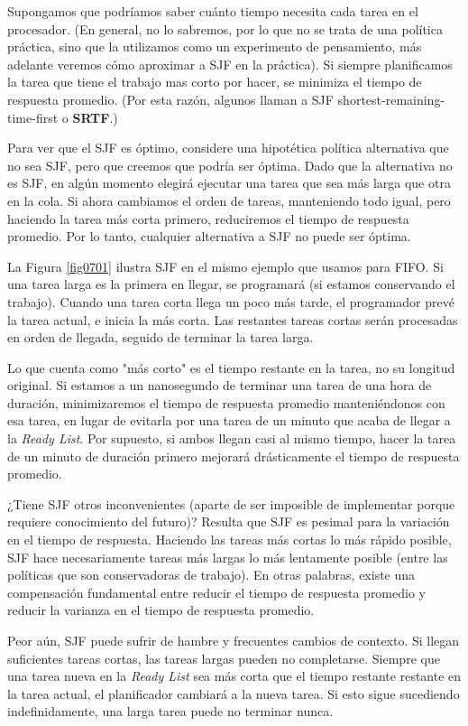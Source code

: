 \documentclass[10pt]{book}
\begin{document}
Supongamos que podríamos saber cuánto tiempo necesita cada tarea en el procesador. (En general, no lo sabremos, por lo que no se trata de una política práctica, sino que la utilizamos como un experimento de pensamiento, más adelante veremos cómo aproximar a SJF en la práctica). Si siempre planificamos la tarea que tiene el trabajo mas corto por hacer, se minimiza el tiempo de respuesta promedio. (Por esta razón, algunos llaman a SJF shortest-remaining-time-first o \textbf{SRTF}.)

Para ver que el SJF es óptimo, considere una hipotética política alternativa que no sea SJF, pero que creemos que podría ser óptima. Dado que la alternativa no es SJF, en algún momento elegirá ejecutar una tarea que sea más larga que otra en la cola. Si ahora cambiamos el orden de tareas, manteniendo todo igual, pero haciendo la tarea más corta primero, reduciremos el tiempo de respuesta promedio. Por lo tanto, cualquier alternativa a SJF no puede ser óptima.

La Figura \ref{fig0701} ilustra SJF en el mismo ejemplo que usamos para FIFO. Si una tarea larga es la primera en llegar, se programará (si estamos conservando el trabajo). Cuando una tarea corta llega un poco más tarde, el programador prevé la tarea actual, e inicia la más corta. Las restantes tareas cortas serán procesadas en orden de llegada, seguido de terminar la tarea larga.

Lo que cuenta como "más corto" es el tiempo restante en la tarea, no su longitud original. Si estamos a un nanosegundo de terminar una tarea de una hora de duración, minimizaremos el tiempo de respuesta promedio manteniéndonos con esa tarea, en lugar de evitarla por una tarea de un minuto que acaba de llegar a la \textit{Ready List}. Por supuesto, si ambos llegan casi al mismo tiempo, hacer la tarea de un minuto de duración primero mejorará drásticamente el tiempo de respuesta promedio.

¿Tiene SJF otros inconvenientes (aparte de ser imposible de implementar porque requiere conocimiento del futuro)? Resulta que SJF es pesimal para la variación en el tiempo de respuesta. Haciendo las tareas más cortas lo más rápido posible, SJF hace necesariamente tareas más largas lo más lentamente posible (entre las políticas que son conservadoras de trabajo). En otras palabras, existe una compensación fundamental entre reducir el tiempo de respuesta promedio y reducir la varianza en el tiempo de respuesta promedio.

Peor aún, SJF puede sufrir de hambre y frecuentes cambios de contexto. Si llegan suficientes tareas cortas, las tareas largas pueden no completarse. Siempre que una tarea nueva en la \textit{Ready List} sea más corta que el tiempo restante restante en la tarea actual, el planificador cambiará a la nueva tarea. Si esto sigue sucediendo indefinidamente, una larga tarea puede no terminar nunca.
\end{document}
